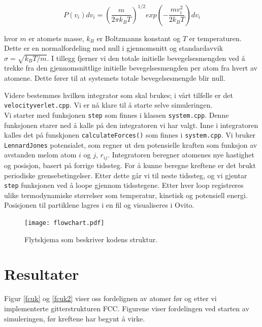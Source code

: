 \documentclass[paper=a4, fontsize=11pt]{scrartcl} %
\numberwithin{equation}{section} %
\numberwithin{figure}{section} %
\numberwithin{table}{section} %
\begin{document}
\begin{equation}
P(v_i)dv_i = \left(\frac{m}{2\pi k_B T} \right)^{1/2} exp \left(- \frac{mv_i^2}{2k_B T} \right)dv_i
\end{equation}

hvor $m$ er atomets masse, $k_B$ er Boltzmanns konstant og $T$ er temperaturen. Dette er en normalfordeling med null i gjennomsnitt og standardavvik $\sigma = \sqrt{k_B T/m}$. I tillegg fjerner vi den totale initielle bevegelsesmengden ved å trekke fra den gjennomsnittlige initielle bevegelsesmengden per atom fra hvert av atomene. Dette fører til at systemets totale bevegelsesmengde blir null.

Videre bestemmes hvilken integrator som skal brukes; i vårt tilfelle er det \texttt{velocityverlet.cpp}. Vi er nå klare til å starte selve simuleringen. \\

Vi starter med funksjonen \texttt{step} som finnes i klassen \texttt{system.cpp}. Denne funksjonen starer ned å kalle på den integratoren vi har valgt. Inne i integratoren kalles det på funskjonen \texttt{calculateForces()} som finnes i \texttt{system.cpp}. Vi bruker \texttt{LennardJones} potensialet, som regner ut den potensielle kraften som funksjon av avstanden melom atom $i$ og $j$, $r_{ij}$. Integratoren beregner atomenes nye hastighet og posisjon, basert på forrige tidssteg. For å kunne beregne kreftene er det brukt periodiske grensebetingelser. Etter dette går vi til neste tidssteg, og vi gjentar \texttt{step} funksjonen ved å loope gjennom tidsstegene. Etter hver loop registreres ulike termodynamiske størrelser som temperatur, kinetisk og potensiell energi. Posisjonen til partiklene lagres i en fil og visualiseres i Ovito. 

\FloatBarrier
\begin{figure}[!ht]
 \centering
 \texttt{[image: flowchart.pdf]}
 \caption{Flytskjema som beskriver kodens struktur.}
 \label{flow}
 \end{figure}
 \FloatBarrier


\section{Resultater}
Figur \ref{fcuk} og \ref{fcuk2} viser oss fordelignen av atomer før og etter vi implementerte gitterstrukturen FCC. Figurene viser fordelingen ved starten av simuleringen, før kreftene har begynt å virke. 
\end{document}

